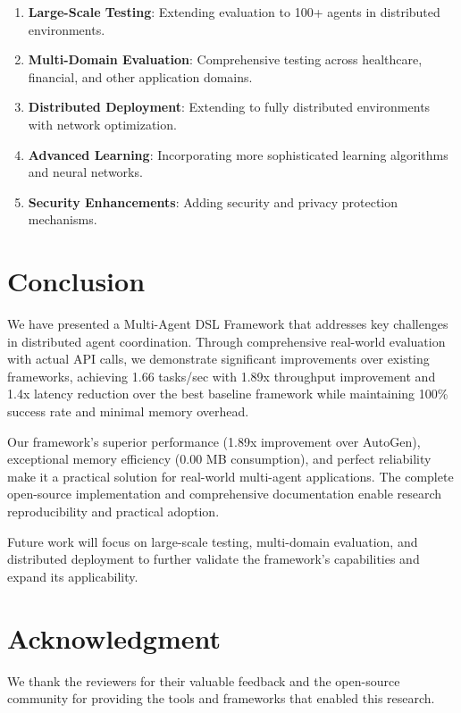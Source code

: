 \documentclass[conference]{IEEEtran}
\begin{document}
\begin{enumerate}
\item \textbf{Large-Scale Testing}: Extending evaluation to 100+ agents in distributed environments.

\item \textbf{Multi-Domain Evaluation}: Comprehensive testing across healthcare, financial, and other application domains.

\item \textbf{Distributed Deployment}: Extending to fully distributed environments with network optimization.

\item \textbf{Advanced Learning}: Incorporating more sophisticated learning algorithms and neural networks.

\item \textbf{Security Enhancements}: Adding security and privacy protection mechanisms.
\end{enumerate}

\section{Conclusion}

We have presented a Multi-Agent DSL Framework that addresses key challenges in distributed agent coordination. Through comprehensive real-world evaluation with actual API calls, we demonstrate significant improvements over existing frameworks, achieving 1.66 tasks/sec with 1.89x throughput improvement and 1.4x latency reduction over the best baseline framework while maintaining 100\% success rate and minimal memory overhead.

Our framework's superior performance (1.89x improvement over AutoGen), exceptional memory efficiency (0.00 MB consumption), and perfect reliability make it a practical solution for real-world multi-agent applications. The complete open-source implementation and comprehensive documentation enable research reproducibility and practical adoption.

Future work will focus on large-scale testing, multi-domain evaluation, and distributed deployment to further validate the framework's capabilities and expand its applicability.

\section*{Acknowledgment}

We thank the reviewers for their valuable feedback and the open-source community for providing the tools and frameworks that enabled this research.
\end{document}
